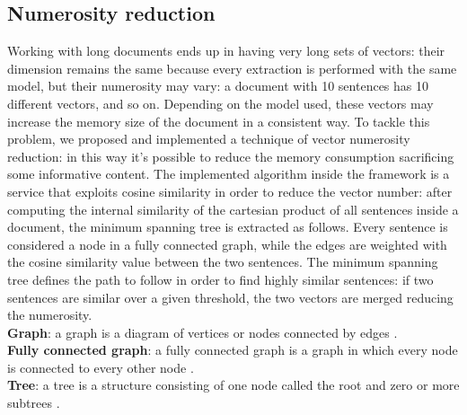 \documentclass[\main/main.tex]{subfiles}
\begin{document}
\subsection{Numerosity reduction}
Working with long documents ends up in having very long sets of vectors: their dimension remains the same because every extraction is performed with the same model, but their numerosity may vary: a document with 10 sentences has 10 different vectors, and so on. Depending on the model used, these vectors may increase the memory size of the document in a consistent way. To tackle this problem, we proposed and implemented a technique of vector numerosity reduction: in this way it's possible to reduce the memory consumption sacrificing some informative content. The implemented algorithm inside the framework is a service that exploits cosine similarity in order to reduce the vector number: after computing the internal similarity of the cartesian product of all sentences inside a document, the minimum spanning tree is extracted as follows. Every sentence is considered a node in a fully connected graph, while the edges are weighted with the cosine similarity value between the two sentences. The minimum spanning tree defines the path to follow in order to find highly similar sentences: if two sentences are similar over a given threshold, the two vectors are merged reducing the numerosity. \\
\textbf{Graph}: a graph is a diagram of vertices or nodes connected by edges \cite{Siu1998IntroductionTG}. \\
\textbf{Fully connected graph}: a fully connected graph is a graph in which every node is connected to every other node \cite{Siu1998IntroductionTG}. \\
\textbf{Tree}: a tree is a structure consisting of one node called the root and zero or more subtrees \cite{tree_definition}.
\end{document}
